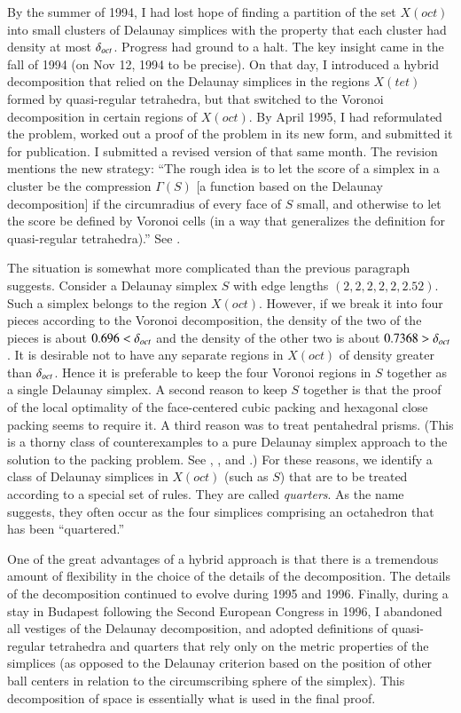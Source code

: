By the summer of 1994, I had lost hope of finding a partition of
the set $X(oct)$ into small clusters of Delaunay simplices with
the property that each cluster had density at most $\delta_{oct}$.
Progress had ground to a halt.   The key insight came in the fall
of 1994 (on Nov 12, 1994 to be precise). On that day, I introduced
a hybrid decomposition that relied on the Delaunay simplices in
the regions $X(tet)$ formed by quasi-regular tetrahedra, but that
switched to the Voronoi decomposition in certain regions of
$X(oct)$. By April 1995, I had reformulated the problem, worked
out a proof of the problem \cite{part2} in its new form, and
submitted it for publication. I submitted a revised version of
\cite{part1} that same month.  The revision mentions the new
strategy: ``The rough idea is to let the score of a simplex in a
cluster be the compression $\Gamma(S)$ [a function based on the
Delaunay decomposition] if the circumradius of every face of $S$
small, and otherwise to let the score be defined by Voronoi cells
(in a way that generalizes the definition for quasi-regular
tetrahedra).'' See \cite[p.6]{part1}.

The situation is somewhat more complicated than the previous
paragraph suggests. Consider a Delaunay simplex $S$ with edge
lengths $(2,2,2,2,2,2.52)$. Such a simplex belongs to the region
$X(oct)$. However, if we break it into four pieces according to
the Voronoi decomposition, the density of the two of the pieces is
about $0.696<\delta_{oct}$ and the density of the other two is about
$0.7368>\delta_{oct}$. It is desirable not to have any separate regions
in $X(oct)$ of density greater than $\delta_{oct}$.  Hence it is
preferable to keep the four Voronoi regions in $S$ together as a
single Delaunay simplex.  A second reason to keep $S$ together is
that the proof of the local optimality of the face-centered cubic
packing and hexagonal close packing seems to require it.  A third
reason was to treat pentahedral prisms.  (This is a thorny class
of counterexamples to a pure Delaunay simplex approach to the
solution to the packing problem.  See \cite{spp}, \cite{remarks},
and \cite{Fer97}.)  For these reasons, we identify a class of
Delaunay simplices in $X(oct)$ (such as $S$) that are to be
treated according to a special set of rules. They are called {\it
quarters}.  As the name suggests, they often occur as the four
simplices comprising an octahedron that has been ``quartered.''

One of the great advantages of a hybrid approach is that there is
a tremendous amount of flexibility in the choice of the details of
the decomposition.  The details of the decomposition continued to
evolve during 1995 and 1996.  Finally, during a stay in Budapest
following the Second European Congress in 1996, I abandoned all
vestiges of the Delaunay decomposition, and adopted definitions of
quasi-regular tetrahedra and quarters that rely only on the metric
properties of the simplices (as opposed to the Delaunay criterion
based on the position of other ball centers in relation to the
circumscribing sphere of the simplex).  This decomposition of
space is essentially what is used in the final proof.

